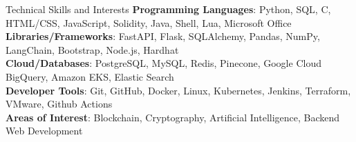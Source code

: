 \documentclass{resume} %
\begin{document}

\begin{rSection}{Technical Skills and Interests}
	\textbf{Programming Languages}{: Python, SQL, C, HTML/CSS, JavaScript, Solidity, Java, Shell, Lua, Microsoft Office} \\
	\textbf{Libraries/Frameworks}{: FastAPI, Flask, SQLAlchemy, Pandas, NumPy, LangChain, Bootstrap, Node.js, Hardhat} \\
	\textbf{Cloud/Databases}{: PostgreSQL, MySQL, Redis, Pinecone, Google Cloud BigQuery, Amazon EKS, Elastic Search} \\
	\textbf{Developer Tools}{: Git, GitHub, Docker, Linux, Kubernetes, Jenkins, Terraform, VMware, Github Actions} \\
	\textbf{Areas of Interest}{: Blockchain, Cryptography, Artificial Intelligence, Backend Web Development}
\end{rSection}
\end{document}
